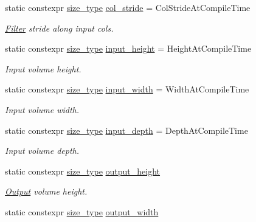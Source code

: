 \begin{DoxyCompactItemize}
static constexpr \hyperlink{namespaceffnn_a63b90a2fd70eb76684eac482a51633e5}{size\-\_\-type} \hyperlink{structffnn_1_1layer_1_1convolution_1_1options_a9f5dc60cb9493d65119fa087c63c0c93}{col\-\_\-stride} = Col\-Stride\-At\-Compile\-Time
\begin{DoxyCompactList}\small\item\em \hyperlink{classffnn_1_1layer_1_1convolution_1_1_filter}{Filter} stride along input cols. \end{DoxyCompactList}\item 
static constexpr \hyperlink{namespaceffnn_a63b90a2fd70eb76684eac482a51633e5}{size\-\_\-type} \hyperlink{structffnn_1_1layer_1_1convolution_1_1options_aabb3c99df1150983902ebf9741a22a1a}{input\-\_\-height} = Height\-At\-Compile\-Time
\begin{DoxyCompactList}\small\item\em Input volume height. \end{DoxyCompactList}\item 
static constexpr \hyperlink{namespaceffnn_a63b90a2fd70eb76684eac482a51633e5}{size\-\_\-type} \hyperlink{structffnn_1_1layer_1_1convolution_1_1options_a17abc9ea9d41cf399fbeae5e3f7580f4}{input\-\_\-width} = Width\-At\-Compile\-Time
\begin{DoxyCompactList}\small\item\em Input volume width. \end{DoxyCompactList}\item 
static constexpr \hyperlink{namespaceffnn_a63b90a2fd70eb76684eac482a51633e5}{size\-\_\-type} \hyperlink{structffnn_1_1layer_1_1convolution_1_1options_a5c928d8733be98927ccd22d009739deb}{input\-\_\-depth} = Depth\-At\-Compile\-Time
\begin{DoxyCompactList}\small\item\em Input volume depth. \end{DoxyCompactList}\item 
static constexpr \hyperlink{namespaceffnn_a63b90a2fd70eb76684eac482a51633e5}{size\-\_\-type} \hyperlink{structffnn_1_1layer_1_1convolution_1_1options_a87fc0d1d3147a21912001842783a0d54}{output\-\_\-height}
\begin{DoxyCompactList}\small\item\em \hyperlink{classffnn_1_1layer_1_1_output}{Output} volume height. \end{DoxyCompactList}\item 
static constexpr \hyperlink{namespaceffnn_a63b90a2fd70eb76684eac482a51633e5}{size\-\_\-type} \hyperlink{structffnn_1_1layer_1_1convolution_1_1options_a3d54e3e43cc0e955c4a64bcf6b5800d7}{output\-\_\-width}

\end{DoxyCompactItemize}
